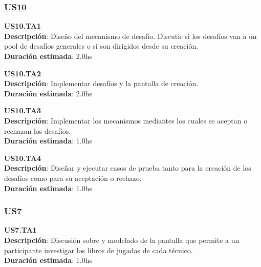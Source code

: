 \subsubsection*{\underline{US10}}

\begin{tcolorbox}
\textbf{US10.TA1} \\
\textbf{Descripción}: Diseño del mecanismo de desafío. Discutir si los desafíos van a un pool de desafíos generales o si son dirigidos desde su creación.\\
\textbf{Duración estimada}: 2.0hs
\end{tcolorbox}
\vspace{10pt}

\begin{tcolorbox}
\textbf{US10.TA2} \\
\textbf{Descripción}: Implementar desafíos y la pantalla de creación.\\
\textbf{Duración estimada}: 2.0hs
\end{tcolorbox}
\vspace{10pt}

\begin{tcolorbox}
\textbf{US10.TA3} \\
\textbf{Descripción}: Implementar los mecanismos mediantes los cuales se aceptan o rechazan los desafíos.\\
\textbf{Duración estimada}: 1.0hs
\end{tcolorbox}
\vspace{10pt}

\begin{tcolorbox}
\textbf{US10.TA4} \\
\textbf{Descripción}: Diseñar y ejecutar casos de prueba tanto para la creación de los desafíos como para su aceptación o rechazo.\\
\textbf{Duración estimada}: 1.0hs
\end{tcolorbox}
\vspace{10pt}



\subsubsection*{\underline{US7}}

\begin{tcolorbox}
\textbf{US7.TA1} \\
\textbf{Descripción}: Discusión sobre y modelado de la pantalla que permite a un participante investigar los libros de jugadas de cada técnico.\\
\textbf{Duración estimada}: 1.0hs
\end{tcolorbox}
\vspace{10pt}

